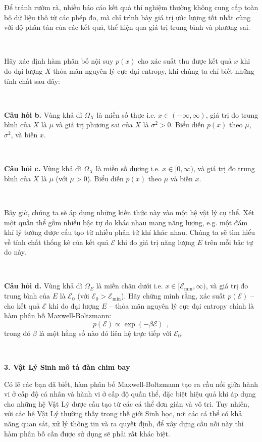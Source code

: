 Để tránh rườm rà, nhiều báo cáo kết quả thí nghiệm thường không cung cấp toàn bộ dữ liệu thô từ các phép đo, mà chỉ trình bày giá trị ước lượng tốt nhất cùng với độ phân tán của các kết quả, thể hiện qua giá trị trung bình và phương sai.

\ \  

Hãy xác định hàm phân bố nội suy $p(x)$ cho xác suất thu được kết quả $x$ khi đo đại lượng $X$ thỏa mãn nguyên lý cực đại entropy, khi chúng ta chỉ biết những tính chất sau đây:

\ \  

\textbf{Câu hỏi b.} Vùng khả dĩ $\Omega_X$ là miền số thực i.e. $x\in (-\infty,\infty)$, giá trị đo trung bình của $X$ là $\mu$ và giá trị phương sai của $X$ là $\sigma^2 > 0$. Biểu diễn $p(x)$ theo $\mu$, $\sigma^2$, và biến $x$.

\ \  

\textbf{Câu hỏi c.} Vùng khả dĩ $\Omega_X$ là miền số dương i.e. $x\in[0,\infty)$, và giá trị đo trung bình của $X$ là $\mu$ (với $\mu > 0$). Biểu diễn $p(x)$ theo $\mu$ và biến $x$.

\ \  

Bây giờ, chúng ta sẽ áp dụng những kiến thức này vào một hệ vật lý cụ thể. Xét một quần thể gồm nhiều bậc tự do khác nhau mang năng lượng, e.g. một đám khí lý tưởng được cấu tạo từ nhiều phân tử khí khác nhau. Chúng ta sẽ tìm hiểu về tính chất thống kê của kết quả $\mathcal{E}$ khi đo giá trị năng lượng $E$ trên mỗi bậc tự do này.

\ \  

\textbf{Câu hỏi d.} Vùng khả dĩ $\Omega_E$ là miền chặn dưới i.e. $x\in[\mathcal{E}_{\min},\infty)$, và giá trị đo trung bình của $E$ là $\mathcal{E}_0$ (với $\mathcal{E}_0 > \mathcal{E}_{\min}$). Hãy chứng minh rằng, xác suất $p(\mathcal{E})$ -- cho kết quả $\mathcal{E}$ khi đo đại lượng $E$ -- thỏa mãn nguyên lý cực đại entropy chính là hàm phân bố Maxwell-Boltzmann:
\begin{equation}
    p(\mathcal{E}) \propto \exp\left( -\beta \mathcal{E} \right) \ \ ,
\end{equation}
trong đó $\beta$ là một hằng số nào đó liên hệ trực tiếp với $\mathcal{E}_0$.

\ \  

\textbf{3. Vật Lý Sinh mô tả đàn chim bay}

Có lẽ các bạn đã biết, hàm phân bố Maxwell-Boltzmann tạo ra cầu nối giữa hành vi ở cấp độ cá nhân và hành vi ở cấp độ quần thể, đặc biệt hiệu quả khi áp dụng cho những hệ Vật Lý được cấu tạo từ các cá thể đơn giản và vô tri. Tuy nhiên, với các hệ Vật Lý thường thấy trong thế giới Sinh học, nơi các cá thể có khả năng quan sát, xử lý thông tin và ra quyết định, để xây dựng cầu nối này thì hàm phân bố cần được sử dụng sẽ phải rất khác biệt.

